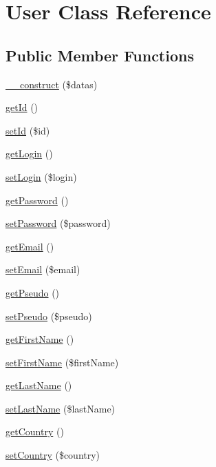 \hypertarget{classUser}{}\section{User Class Reference}
\label{classUser}
\subsection*{Public Member Functions}
\begin{DoxyCompactItemize}
\item 
\hyperlink{classUser_a962fbe0cd4ec9a5f4bb47a5dff80450c}{\+\_\+\+\_\+construct} (\$datas)
\item 
\hyperlink{classUser_a39ad6e655fcc40623b9af2203cd7afa5}{get\+Id} ()
\item 
\hyperlink{classUser_a5c5a688ef7eb0c1c695a00569250dee1}{set\+Id} (\$id)
\item 
\hyperlink{classUser_abb7fb2783594f43943adcaa292f060e4}{get\+Login} ()
\item 
\hyperlink{classUser_a61ffe786329ca6a618864173060a5d5d}{set\+Login} (\$login)
\item 
\hyperlink{classUser_a3e71eeea3e373e90dc902cc2f318ad3d}{get\+Password} ()
\item 
\hyperlink{classUser_aadc1995517c1e8190006d0dba87b28c4}{set\+Password} (\$password)
\item 
\hyperlink{classUser_acf082b95b344df14b9e8a6c09868dbcd}{get\+Email} ()
\item 
\hyperlink{classUser_a018ae17e436e09134922835cdd3235a7}{set\+Email} (\$email)
\item 
\hyperlink{classUser_a9c2b57df71464b850d47e472cd462ff8}{get\+Pseudo} ()
\item 
\hyperlink{classUser_afa0f13589eb9cdaca9a8192d245fd75f}{set\+Pseudo} (\$pseudo)
\item 
\hyperlink{classUser_a1797d3f80cc25452b4e97232ef14c6be}{get\+First\+Name} ()
\item 
\hyperlink{classUser_a3c626d0aca50df67aa89793615b7ffd1}{set\+First\+Name} (\$first\+Name)
\item 
\hyperlink{classUser_af0efc9a6afcaf0774ef627dbc4dbe43e}{get\+Last\+Name} ()
\item 
\hyperlink{classUser_acbe8bdd002179a3bc115ec7a9afb7e0b}{set\+Last\+Name} (\$last\+Name)
\item 
\hyperlink{classUser_af801acdc6910f528757a5dfaa672514f}{get\+Country} ()
\item 
\hyperlink{classUser_a8dab2459d8d2cc332fcb97aee342914f}{set\+Country} (\$country)

\end{DoxyCompactItemize}
